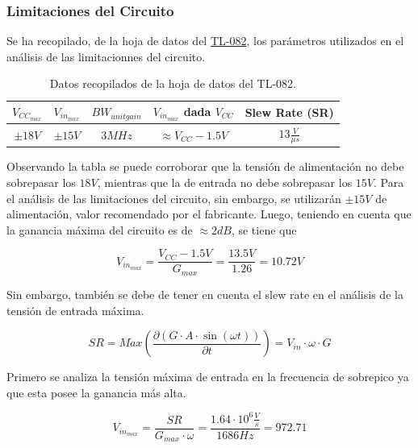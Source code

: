\subsubsection{Limitaciones del Circuito}
\label{sec:limitaciones}

Se ha recopilado, de la hoja de datos del \href{http://www.ti.com/lit/ds/symlink/tl082.pdf}{TL-082}, los parámetros utilizados en el análisis de las limitacionnes del circuito.

\begin{table}[H]
\centering
\begin{tabular}{@{}ccccc@{}}
\toprule
$V_{CC_{max}}$ & $V_{in_{max}}$ & $BW_{unitgain}$ & $V_{in_{max}}$ dada $V_{CC}$ & Slew Rate (SR)\\ \midrule
$\pm 18V$ & $\pm 15V$ & $3MHz$ & $\approx V_{CC}-1.5V$ & $13\frac{V}{\mu s}$\\ \bottomrule
\end{tabular}
\caption{Datos recopilados de la hoja de datos del TL-082.}
\label{tab:datos_tl082}
\end{table}

Observando la tabla se puede corroborar que la tensión de alimentación no debe sobrepasar los $18V$, mientras que la de entrada no debe sobrepasar los $15V$. Para el análisis de las limitaciones del circuito, sin embargo, se utilizarán $\pm 15V$ de alimentación, valor recomendado por el fabricante.
Luego, teniendo en cuenta que la ganancia máxima del circuito es de $\approx 2dB$, se tiene que

\begin{equation}
	V_{in_{max}} = \frac{V_{CC} - 1.5V}{G_{max}} = \frac{13.5V}{1.26} = 10.72V
\end{equation}

Sin embargo, también se debe de tener en cuenta el slew rate en el análisis de la tensión de entrada máxima.

\begin{equation}
	SR= Max\left( \frac{\partial (G\cdot A\cdot \sin (\omega t))}{\partial t}\right) = V_{in} \cdot \omega \cdot G  
\end{equation}

Primero se analiza la tensión máxima de entrada en la frecuencia de sobrepico ya que esta posee la ganancia más alta.

\begin{equation}
	V_{in_{max}} = \frac{SR}{G_{max}\cdot \omega} = \frac{1.64\cdot 10^6\frac{V}{s}}{1686Hz} = 972.71
\end{equation}

